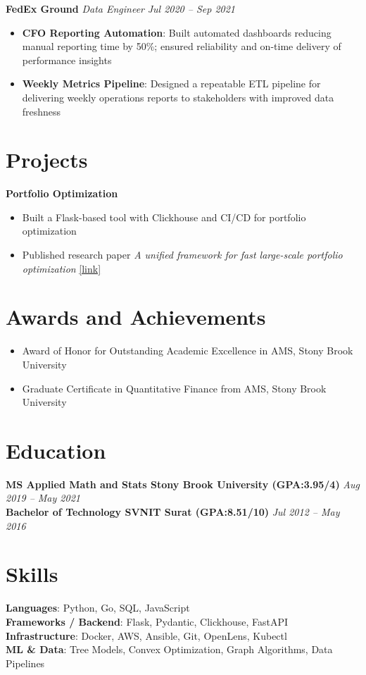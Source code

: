 \documentclass[letterpaper,10pt]{article}
\begin{document}
\textbf{{FedEx Ground}} \textit{{Data Engineer}} \hfill \textit{{Jul 2020 -- Sep 2021}}
\begin{itemize}
    \item \textbf{{CFO Reporting Automation}}: Built automated dashboards reducing manual reporting time by 50\%; ensured reliability and on-time delivery of performance insights
    \item \textbf{{Weekly Metrics Pipeline}}: Designed a repeatable ETL pipeline for delivering weekly operations reports to stakeholders with improved data freshness
\end{itemize}
\section*{Projects}
\textbf{{Portfolio Optimization}}
\begin{itemize}
    \item Built a Flask-based tool with Clickhouse and CI/CD for portfolio optimization
    \item Published research paper \textit{{A unified framework for fast large-scale portfolio optimization}} \href{{https://arxiv.org/abs/2303.12751}}{{[link]}}
\end{itemize}
\section*{ Awards and Achievements}
\begin{itemize}
    \item Award of Honor for Outstanding Academic Excellence in AMS, Stony Brook University
    \item Graduate Certificate in Quantitative Finance from AMS, Stony Brook University
\end{itemize}
\section*{Education}
\textbf{{MS Applied Math and Stats Stony Brook University (GPA:3.95/4)}} \hfill \textit{{Aug 2019 -- May 2021}} \\
\textbf{{Bachelor of Technology SVNIT Surat (GPA:8.51/10)}} \hfill \textit{{Jul 2012 -- May 2016}} 
\section*{Skills}
\textbf{{Languages}}: Python, Go, SQL, JavaScript\\
\textbf{{Frameworks / Backend}}: Flask, Pydantic, Clickhouse, FastAPI\\
\textbf{{Infrastructure}}: Docker, AWS, Ansible, Git, OpenLens, Kubectl\\
\textbf{{ML \& Data}}: Tree Models, Convex Optimization, Graph Algorithms, Data Pipelines
\end{document}
